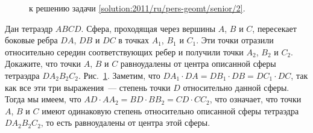 \ifsolution
\begin{figure}\centering
    \caption{к решению задачи \ref{solution:2011/ru/pers-geomt/senior/2}.}
    \label{fig:solution:2011/ru/pers-geomt/senior/2}
\end{figure}%
\fi %

\problem
Дан тетраэдр $ABCD$.
Сфера, проходящая через вершины $A$, $B$ и $C$, пересекает боковые ребра
$DA$, $DB$ и $DC$ в точках $A_1$, $B_1$ и $C_1$.
Эти точки отразили относительно середин соответствующих ребер и получили точки
$A_2$, $B_2$ и $C_2$.
Докажите, что точки $A$, $B$ и $C$ равноудалены от центра описанной
сферы тетраэдра $D A_2 B_2 C_2$.
\solution
\label{solution:2011/ru/pers-geomt/senior/2}%
Рис.~\ref{fig:solution:2011/ru/pers-geomt/senior/2}.
Заметим, что $D A_1 \cdot DA = D B_1 \cdot DB = D C_1 \cdot DC$, так как все
эти три выражения~--- степень точки $D$ относительно данной сферы.
Тогда мы имеем, что
$AD \cdot A A_2 = BD \cdot B B_2 = CD \cdot C C_2$,
что означает, что точки $A$, $B$ и $C$ имеют одинаковую степень относительно
описанной сферы тетраэдра $D A_2 B_2 C_2$, то есть равноудалены от центра этой
сферы.
\endproblem
